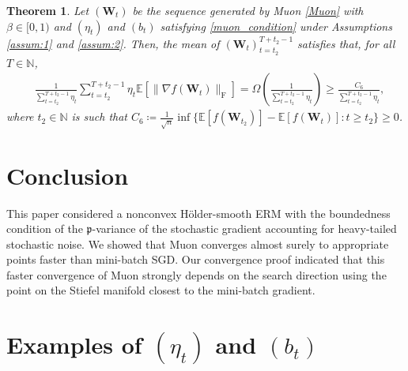 \documentclass[twoside,11pt]{article}
\newtheorem{thm}{Theorem}[section]
\begin{document}
\begin{thm}\label{thm:muon_convergence_rate_lower}
Let $(\bm{W}_t)$ be the sequence generated by Muon \eqref{Muon} with $\beta \in [0,1)$ and $(\eta_t)$ and $(b_t)$ satisfying \eqref{muon_condition} under Assumptions \ref{assum:1} and \ref{assum:2}. Then, the mean of $(\bm{W}_t)_{t = t_2}^{T + t_2 -1}$ satisfies that, for all $T \in \mathbb{N}$,
\begin{align*}
&\frac{1}{\sum_{t= t_2}^{T + t_2 -1} \eta_t}
\sum_{t= t_2}^{T + t_2 -1} \eta_t 
\mathbb{E} [\| \nabla f (\bm{W}_t)\|_{\mathrm{F}}]
= \Omega \left( \frac{1}{\sum_{t= t_2}^{T + t_2 -1} \eta_t} \right) 
\geq \frac{C_6}{\sum_{t = t_2}^{T + t_2 -1} \eta_t},
\end{align*}
where $t_2 \in \mathbb{N}$ is such that $C_6 \coloneqq \frac{1}{\sqrt{n}} \inf \{\mathbb{E}[f(\bm{W}_{t_2})] - \mathbb{E}[f(\bm{W}_t)] \colon t \geq t_2 \} \geq 0$.
\end{thm}

\section{Conclusion}
This paper considered a nonconvex H\"{o}lder-smooth ERM with the boundedness condition of the $\mathfrak{p}$-variance of the stochastic gradient accounting for heavy-tailed stochastic noise. We showed that Muon converges almost surely to appropriate points faster than mini-batch SGD. Our convergence proof indicated that this faster convergence of Muon strongly depends on the search direction using the point on the Stiefel manifold closest to the mini-batch gradient. 



\appendix
\section{Examples of $(\eta_t)$ and $(b_t)$}
\label{app:conditions}
\end{document}
